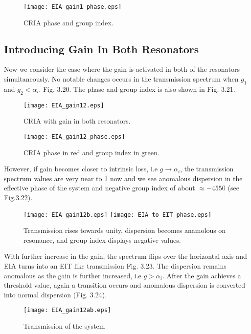 \begin{figure}[h]
\centering
\texttt{[image: EIA\_gain1\_phase.eps]}
\caption{CRIA phase and group index.}
\end{figure}


\subsection{Introducing Gain In Both Resonators}
Now we consider the case where the gain is activated in both of the resonators simultaneously. No notable changes occurs in the transmission spectrum when $g_{1}$ and $g_{2} < \alpha_{i}$. Fig. 3.20. The phase and group index is also shown in Fig. 3.21.

\begin{figure}[h]
\centering
\texttt{[image: EIA\_gain12.eps]}
\caption{CRIA with gain in both resonators.}
\end{figure}


\begin{figure}[h]
\centering
\texttt{[image: EIA\_gain12\_phase.eps]}
\caption{CRIA phase in red and group index in green.}
\end{figure}

However, if gain becomes closer to intrinsic loss, i.e $g \to \alpha_{i}$, the transmission spectrum values are very near to 1 now and we see anomalous dispersion in the effective phase of the system and negative group index of about $\approx -4550$ (see Fig.3.22).

\begin{figure}[h]
\centering
\texttt{[image: EIA\_gain12b.eps]}
\texttt{[image: EIA\_to\_EIT\_phase.eps]}
\caption{Transmission rises towards unity, dispersion becomes anamolous on resonance, and group index displays negative values.}
\end{figure}

With further increase in the gain, the spectrum flips over the horizontal axis and EIA turns into an EIT like transmission Fig. 3.23. The dispersion remains anomalous as the gain is further increased, i.e $g > \alpha_{i}$. After the gain achieves a threshold value, again a transition occurs and anomalous dispersion is converted into normal dispersion (Fig. 3.24).

\begin{figure}[h]
\centering
\texttt{[image: EIA\_gain12ab.eps]}
\caption{Transmission of the system}
\end{figure}

